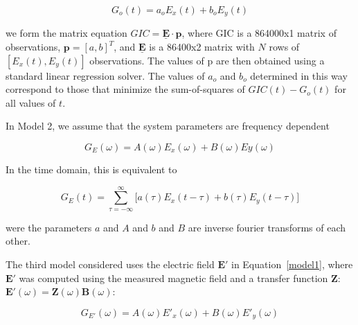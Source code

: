 \documentclass[draft,linenumbers]{agujournal2018}
\begin{document}
\begin{linenomath*}
\begin{equation}
G_o(t) = a_oE_x(t) + b_oE_y(t)
\label{model1}
\end{equation}
\end{linenomath*}

\noindent
we form the matrix equation $GIC = \underline{\mathbf{E}}\cdot\mathbf{p}$, where GIC is a 864000x1 matrix of observations, $\mathbf{p} = [a,b]^T$, and $\underline{\mathbf{E}}$ is a 86400x2 matrix with $N$ rows of $[E_x(t), E_y(t)]$ observations. The values of p are then obtained using a standard linear regression solver. The values of $a_o$ and $b_o$ determined in this way correspond to those that minimize the sum-of-squares of $GIC(t)-G_o(t)$ for all values of $t$. \citep[][ provided the mathematically equivalent closed-form equations.]{Pulkkinen2007}

In Model 2, we assume that the system parameters are frequency dependent

\begin{linenomath*}
\begin{equation}
G_E(\omega) = A(\omega)E_x(\omega) + B(\omega)Ey(\omega)
\label{model2}
\tag{2a}
\end{equation}
\end{linenomath*}

\noindent
In the time domain, this is equivalent to

\begin{linenomath*}
\begin{equation}
G_E(t) = \sum_{\tau=-\infty}^{\infty}\big[a(\tau)E_x(t-\tau) + b(\tau)E_y(t-\tau)\big]
\label{model2b}
\tag{2b}
\end{equation}
\end{linenomath*}

\noindent
were the parameters $a$ and $A$ and $b$ and $B$ are inverse fourier transforms of each other.

The third model considered uses the electric field $\mathbf{E}'$ in Equation~\ref{model1}, where $\mathbf{E}'$ was computed using the measured magnetic field and a transfer function $\mathbf{Z}$: $\mathbf{E}'(\omega) = \mathbf{Z}(\omega)\mathbf{B}(\omega)$:

\setcounter{equation}{2}
\begin{linenomath*}
\begin{equation}
G_{E'}(\omega) = A(\omega)E'_x(\omega) + B(\omega)E'_y(\omega)
\end{equation}
\end{linenomath*}
\end{document}
